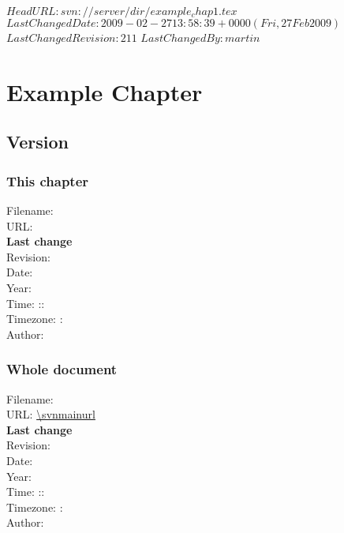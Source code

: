 \svnidlong
{$HeadURL: svn://server/dir/example_chap1.tex $}
{$LastChangedDate: 2009-02-27 13:58:39 +0000 (Fri, 27 Feb 2009) $}
{$LastChangedRevision: 211 $}
{$LastChangedBy: martin $}

\chapter{Example Chapter}

\section{Version}
\subsection*{This chapter}
Filename: \svnnolinkurl{\svnfilefname}\\
URL: \svnnolinkurl{\svnfileurl}\\
\textbf{Last change}\\
Revision: \svnfilerev\\
Date: \svnfiledate\\
Year: \svnfileyear\\
Time: \svnfilehour:\svnfileminute:\svnfilesecond\ \svnfiletimezone\\
Timezone: \svnfiletimezonehour : \svnfiletimezoneminute\\
Author: \svnfileauthor\\

\subsection*{Whole document}
Filename: \svnnolinkurl{\svnmainfilename}\\
URL: \url{\svnmainurl}\\
\textbf{Last change}\\
Revision: \svnrev\\
Date: \svndate\\
Year: \svnyear\\
Time: \svnhour:\svnminute:\svnsecond\ \svntimezone\\
Timezone: \svntimezonehour : \svntimezoneminute\\
Author: \svnauthor\\

